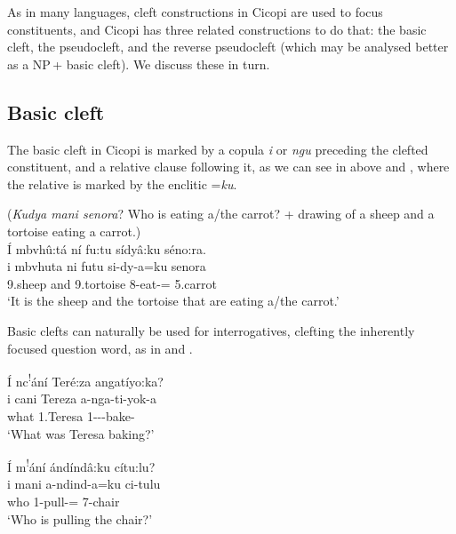 \documentclass[output=paper]{langscibook}
\begin{document}
\z

As in many languages, cleft constructions in Cicopi are used to focus constituents, and Cicopi has three related constructions to do that: the basic cleft, the pseudocleft, and the reverse pseudocleft (which may be analysed better as a NP\,+ basic cleft). We discuss these in turn.

\subsection{Basic cleft}

The basic cleft in Cicopi is marked by a copula \textit{i} or \textit{ngu} preceding the clefted constituent, and a relative clause following it, as we can see in  above and , where the relative is marked by the enclitic =\textit{ku}.

\ea
\label{bkm:Ref120693136}
(\textit{Kudya mani senora}? Who is eating a/the carrot? + drawing of a sheep and a tortoise eating a carrot.)\\
Í mbvhû:tá ní fu:tu sídyâ:ku séno:ra.\\
\gll
i  mbvhuta  ni  futu  si-dy-a=ku  senora\\
\COP{}  9.sheep and  9.tortoise  8\SM{}-eat-\FV{}=\REL{}  5.carrot\\
\glt
‘It is the sheep and the tortoise that are eating a/the carrot.’\\

\z

Basic clefts can naturally be used for interrogatives, clefting the inherently focused question word, as in  and .

\ea
\label{bkm:Ref126844879}
Í nc\textsuperscript{!}ání Teré:za angatíyo:ka?\\
\gll
i  cani  Tereza  a-nga-ti-yok-a\\
\COP{}  what  1.Teresa  1\SM{}-\REL{}-\IPFV{}-bake-\FV{}\\
\glt
‘What was Teresa baking?’\\

\z

\ea
\label{bkm:Ref126844882}
Í m\textsuperscript{!}ání ándíndâ:ku cítu:lu?\\
\gll
i  mani  a-ndind-a=ku  ci-tulu\\
\COP{}  who  1\SM{}-pull-\FV{}=\REL{}  7-chair\\
\glt
‘Who is pulling the chair?’\\
\end{document}
